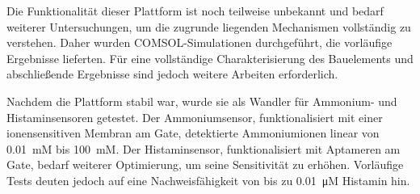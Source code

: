 Die Funktionalität dieser Plattform ist noch teilweise unbekannt und bedarf weiterer Untersuchungen, um die zugrunde liegenden Mechanismen vollständig zu verstehen. Daher wurden COMSOL-Simulationen durchgeführt, die vorläufige Ergebnisse lieferten. Für eine vollständige Charakterisierung des Bauelements und abschließende Ergebnisse sind jedoch weitere Arbeiten erforderlich.

Nachdem die Plattform stabil war, wurde sie als Wandler für Ammonium- und Histaminsensoren getestet. Der Ammoniumsensor, funktionalisiert mit einer ionensensitiven Membran am Gate, detektierte Ammoniumionen linear von \SI{0,01}{mM} bis \SI{100}{mM}. Der Histaminsensor, funktionalisiert mit Aptameren am Gate, bedarf weiterer Optimierung, um seine Sensitivität zu erhöhen. Vorläufige Tests deuten jedoch auf eine Nachweisfähigkeit von bis zu \SI{0,01}{\micro M} Histamin hin.